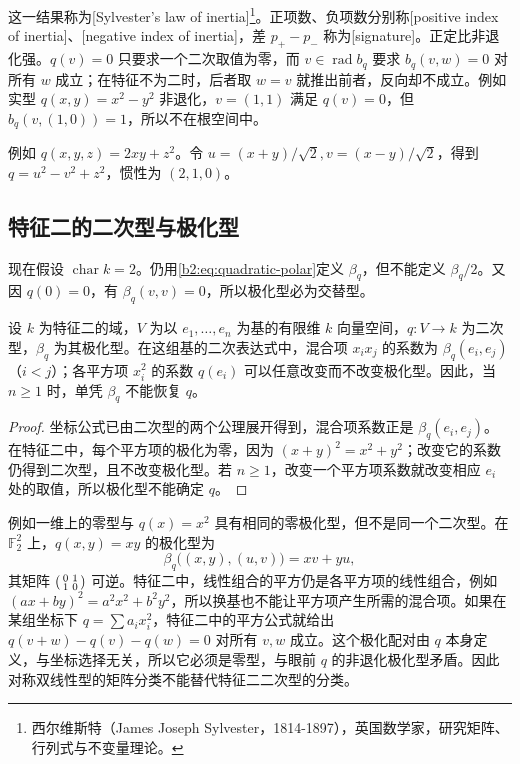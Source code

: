 这一结果称为[Sylvester's law of inertia]\footnote{西尔维斯特（James Joseph Sylvester，1814-1897），英国数学家，研究矩阵、行列式与不变量理论。}。正项数、负项数分别称[positive index of inertia]、[negative index of inertia]，差 \(p_+-p_-\) 称为[signature]。正定比非退化强。\(q(v)=0\) 只要求一个二次取值为零，而 \(v\in\operatorname{rad}b_q\) 要求 \(b_q(v,w)=0\) 对所有 \(w\) 成立；在特征不为二时，后者取 \(w=v\) 就推出前者，反向却不成立。例如实型 \(q(x,y)=x^2-y^2\) 非退化，\(v=(1,1)\) 满足 \(q(v)=0\)，但 \(b_q(v,(1,0))=1\)，所以不在根空间中。

\ProseParagraphBreak
例如 \(q(x,y,z)=2xy+z^2\)。令 \(u=(x+y)/\sqrt2,v=(x-y)/\sqrt2\)，得到 \(q=u^2-v^2+z^2\)，惯性为 \((2,1,0)\)。

\subsection{特征二的二次型与极化型}
\label{b2:subsec:1002:03}

现在假设 \(\operatorname{char}k=2\)。仍用\eqref{b2:eq:quadratic-polar}定义 \(\beta_q\)，但不能定义 \(\beta_q/2\)。又因 \(q(0)=0\)，有 \(\beta_q(v,v)=0\)，所以极化型必为交替型。

\begin{proposition}\label{b2:prop:quadratic-char-two-coordinates}
	设 \(k\) 为特征二的域，\(V\) 为以 \(e_1,\ldots,e_n\) 为基的有限维 \(k\) 向量空间，\(q:V\to k\) 为二次型，\(\beta_q\) 为其极化型。在这组基的二次表达式中，混合项 \(x_ix_j\) 的系数为 \(\beta_q(e_i,e_j)\)（\(i<j\)）；各平方项 \(x_i^2\) 的系数 \(q(e_i)\) 可以任意改变而不改变极化型。因此，当 \(n\ge1\) 时，单凭 \(\beta_q\) 不能恢复 \(q\)。
\end{proposition}
\begin{proof}
	坐标公式已由二次型的两个公理展开得到，混合项系数正是 \(\beta_q(e_i,e_j)\)。在特征二中，每个平方项的极化为零，因为 \((x+y)^2=x^2+y^2\)；改变它的系数仍得到二次型，且不改变极化型。若 \(n\ge1\)，改变一个平方项系数就改变相应 \(e_i\) 处的取值，所以极化型不能确定 \(q\)。
\end{proof}

例如一维上的零型与 \(q(x)=x^2\) 具有相同的零极化型，但不是同一个二次型。在 \(\mathbb F_2^2\) 上，\(q(x,y)=xy\) 的极化型为
\[
	\beta_q\bigl((x,y),(u,v)\bigr)=xv+yu,
\]
其矩阵 \(\begin{psmallmatrix}0&1\\1&0\end{psmallmatrix}\) 可逆。特征二中，线性组合的平方仍是各平方项的线性组合，例如 \((ax+by)^2=a^2x^2+b^2y^2\)，所以换基也不能让平方项产生所需的混合项。如果在某组坐标下 \(q=\sum a_ix_i^2\)，特征二中的平方公式就给出 \(q(v+w)-q(v)-q(w)=0\) 对所有 \(v,w\) 成立。这个极化配对由 \(q\) 本身定义，与坐标选择无关，所以它必须是零型，与眼前 \(q\) 的非退化极化型矛盾。因此对称双线性型的矩阵分类不能替代特征二二次型的分类。

